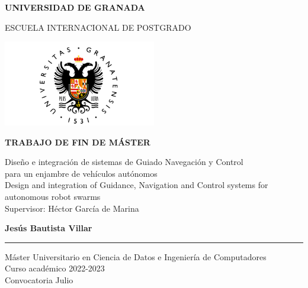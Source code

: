 
\begin{titlepage}
\centering
{ \bfseries \Large UNIVERSIDAD DE GRANADA}
\vspace{1cm}

{\large ESCUELA INTERNACIONAL DE POSTGRADO}
\vspace{0.8cm}

{\includegraphics[width=0.50\textwidth]{fig/UGR-Logo.png}}
\vspace{0.8cm}

{\bfseries \Large TRABAJO DE FIN DE MÁSTER}

\vfill
{\Large Diseño e integración de sistemas de Guiado Navegación y Control \\ para un enjambre de vehículos autónomos}\vspace{5mm} \\
{\Large Design and integration of Guidance, Navigation and Control systems for autonomous robot swarms}\vspace{15mm} \\
{\Large Supervisor: Héctor García de Marina}\\ 
\vfill

{\bfseries \LARGE Jesús Bautista Villar} \\
\noindent\rule{8cm}{0.4pt}\vspace{5mm}

{\large Máster Universitario en Ciencia de Datos e Ingeniería de Computadores}\vspace{2.5mm} \\
{\large Curso académico 2022-2023}\vspace{2.5mm} \\
{\large Convocatoria Julio} \\ 

\end{titlepage}


